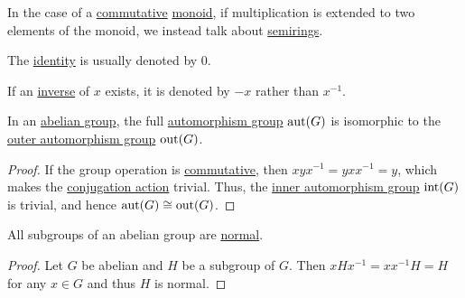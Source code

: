 \begin{remark}
\begin{thmenum}
    In the case of a \hyperref[def:magma/commutative]{commutative} \hyperref[def:monoid]{monoid}, if multiplication is extended to two elements of the monoid, we instead talk about \hyperref[def:semiring]{semirings}.

     The \hyperref[def:monoid]{identity} is usually denoted by \( 0 \).

     If an \hyperref[def:monoid_inverse_element]{inverse} of \( x \) exists, it is denoted by \( -x \) rather than \( x^{-1} \).
  \end{thmenum}
\end{remark}

\begin{proposition}\label{thm:abelian_outer_automorphism_group}
  In an \hyperref[def:abelian_group]{abelian group}, the full \hyperref[def:automorphism_group]{automorphism group} \( \operatorname{aut}(G) \) is isomorphic to the \hyperref[def:inner_and_outer_automorphisms]{outer automorphism group} \( \operatorname{out}(G) \).
\end{proposition}
\begin{proof}
  If the group operation is \hyperref[def:magma/commutative]{commutative}, then \( xyx^{-1} = yxx^{-1} = y \), which makes the \hyperref[def:inner_and_outer_automorphisms]{conjugation action} trivial. Thus, the \hyperref[def:inner_and_outer_automorphisms]{inner automorphism group} \( \operatorname{int}(G) \) is trivial, and hence \( \operatorname{aut}(G) \cong \operatorname{out}(G) \).
\end{proof}

\begin{proposition}\label{thm:abelian_normal_subgroups}
  All subgroups of an abelian group are \hyperref[def:normal_subgroup]{normal}.
\end{proposition}
\begin{proof}
  Let \( G \) be abelian and \( H \) be a subgroup of \( G \). Then \( x H x^{-1} = xx^{-1} H = H \) for any \( x \in G \) and thus \( H \) is normal.
\end{proof}

